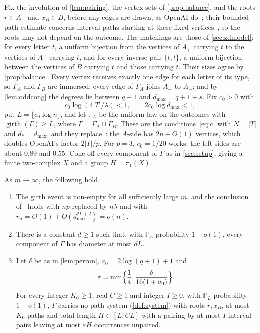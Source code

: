 \documentclass[11pt]{article}
\theoremstyle{definition}
\theoremstyle{plain}
\newcommand{\eps}{\varepsilon}
\newcommand{\girth}{\operatorname{girth}}
\begin{document}
Fix the involution of \cref{lem:pairing}, the vertex sets of \cref{prop:balance}, and the roots $r\in A_+$ and $x_B\in B$, before any edges are drawn, as OpenAI do~\cite[\S3.1]{OAI197a}; their bounded path estimate concerns interval paths starting at these fixed vertices~\cite[Thm.~4.1]{OAI197a}, so the roots may not depend on the outcome. The matchings are those of \cref{sec:zdmodel}: for every letter $t$, a uniform bijection from the vertices of $A_+$ carrying $t$ to the vertices of $A_-$ carrying $\bar t$, and for every inverse pair $\{t,\bar t\}$, a uniform bijection between the vertices of $B$ carrying $t$ and those carrying $\bar t$. Their sizes agree by \cref{prop:balance}. Every vertex receives exactly one edge for each letter of its type, so $\Gamma_A$ and $\Gamma_B$ are immersed; every edge of $\Gamma_A$ joins $A_+$ to $A_-$; and by \cref{lem:oddcong} the degrees lie between $q+1$ and $d_{\max}=q+1+s$. Fix $c_0>0$ with
\begin{equation}\label{eq:oddc}
c_0\log(4|T|/\lambda)<1,\qquad 2c_0\log d_{\max}<1,
\end{equation}
put $L=\lfloor c_0\log n\rfloor$, and let $\mathbb P_L$ be the uniform law on the outcomes with $\girth(\Gamma)\ge L$, where $\Gamma=\Gamma_A\sqcup\Gamma_B$. These are the conditions~\eqref{eq:c} with $N=|T|$ and $d_*=d_{\max}$, and they replace~\cite[(3.9)]{OAI197a}: the $A$-side has $2n+O(1)$ vertices, which doubles OpenAI's factor $2|T|/p$. For $p=3$, $c_0=1/20$ works; the left sides are about $0.89$ and $0.55$. Cone off every component of $\Gamma$ as in \cref{sec:setup}, giving a finite two-complex $X$ and a group $H=\pi_1(X)$.

\begin{proposition}\label{prop:oddtransfer}
As $m\to\infty$, the following hold.
\begin{enumerate}[label=\textup{(\alph*)},itemsep=0pt]
\item The girth event is non-empty for all sufficiently large $m$, and the conclusion of~\cite[Lemma~3.3]{OAI197a} holds with $np$ replaced by $n\lambda$ and with $r_n=O(1)+O(d_{\max}^{2L+2})=o(n)$.
\item There is a constant $d\ge1$ such that, with $\mathbb P_L$-probability $1-o(1)$, every component of $\Gamma$ has diameter at most $dL$.
\item Let $\delta$ be as in \cref{lem:perron}, $a_0=2\log(q+1)+1$ and
\[
\eps=\min\Bigl\{\frac14,\frac{\delta}{16(1+a_0)}\Bigr\}.
\]
For every integer $K_0\ge1$, real $C\ge1$ and integer $I\ge0$, with $\mathbb P_L$-probability $1-o(1)$, $\Gamma$ carries no path system (\cref{def:system}) with roots $r,x_B$, at most $K_0$ paths and total length $H\in[L,CL]$ with a pairing by at most $I$ interval pairs leaving at most $\eps H$ occurrences unpaired.
\end{enumerate}
\end{proposition}
\end{document}
